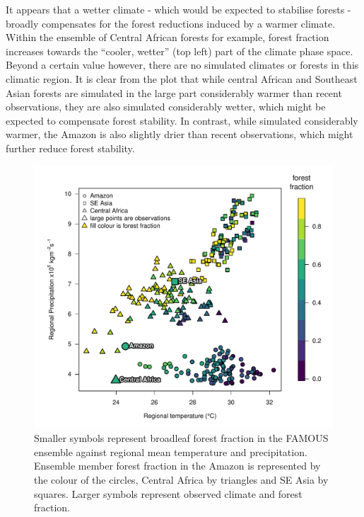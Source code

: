 \documentclass[gmd, manuscript]{copernicus}
\begin{document}
It appears that a wetter climate - which would be expected to stabilise forests - broadly compensates for the forest reductions induced by a warmer climate. Within the ensemble of Central African forests for example, forest fraction increases towards the ``cooler, wetter'' (top left) part of the climate phase space. Beyond a certain value however, there are no simulated climates or forests in this climatic region. It is clear from the plot that while central African and Southeast Asian forests are simulated in the large part considerably warmer than recent observations, they are also simulated considerably wetter, which might be expected to compensate forest stability. In contrast, while simulated considerably warmer, the Amazon is also slightly drier than recent observations, which might further reduce forest stability.

\begin{figure}[t]
\includegraphics[width=12cm]{../graphics/fraction_vs_temp_precip_pcolcor.pdf}
\caption{Smaller symbols represent broadleaf forest fraction in the FAMOUS ensemble against regional mean temperature and precipitation. Ensemble member forest fraction in the Amazon is represented by the colour of the circles, Central Africa by triangles and SE Asia by squares. Larger symbols represent observed climate and forest fraction.
}
\label{fig:fraction_vs_temp_precip_pcolcor}
\end{figure}
\end{document}

